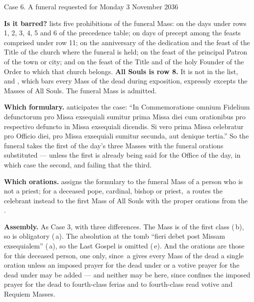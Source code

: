 \begin{casebox}{Case 6. A funeral requested for Monday 3 November 2036}

\begin{steps}
\item \textbf{Is it barred?}  lists five prohibitions of the funeral
Mass: on the days under rows 1, 2, 3, 4, 5 and 6 of the precedence table; on
days of precept among the feasts comprised under row 11; on the anniversary of
the dedication and the feast of the Title of the church where the funeral is
held; on the feast of the principal Patron of the town or city; and on the
feast of the Title and of the holy Founder of the Order to which that church
belongs. \textbf{All Souls is row 8.} It is not in the list, and ,
which bars every Mass of the dead during exposition, expressly excepts the
Masses of All Souls. The funeral Mass is admitted.

\item \textbf{Which formulary.}  anticipates the case: ``In
Commemoratione omnium Fidelium defunctorum pro Missa exsequiali sumitur prima
Missa diei cum orationibus pro respectivo defuncto in Missa exsequiali
dicendis. Si vero prima Missa celebratur pro Officio diei, pro Missa exsequiali
sumitur secunda, aut denique tertia.'' So the funeral takes the first of the
day's three Masses with the funeral orations substituted --- unless the first
is already being said for the Office of the day, in which case the second, and
failing that the third.

\item \textbf{Which orations.}  assigns the formulary  to the funeral Mass of a person who is not a
priest; for a deceased pope, cardinal, bishop or priest, \,a routes
the celebrant instead to the first Mass of All Souls with the proper orations
from the .

\item \textbf{Assembly.} As Case 3, with three differences. The Mass is of the
first class (\,b), so  is obligatory (\,a).
The absolution at the tomb ``fieri debet post Missam exsequialem''
(\,a), so the Last Gospel is omitted (\,e). And the orations
are those for this deceased person, one only, since \,a gives every
Mass of the dead a single oration unless an imposed prayer for the dead under
 or a votive prayer for the dead under  may be added --- and
neither may be here, since  confines the imposed prayer for the dead
to fourth-class ferias and to fourth-class read votive and Requiem Masses.


\end{steps}
\end{casebox}
